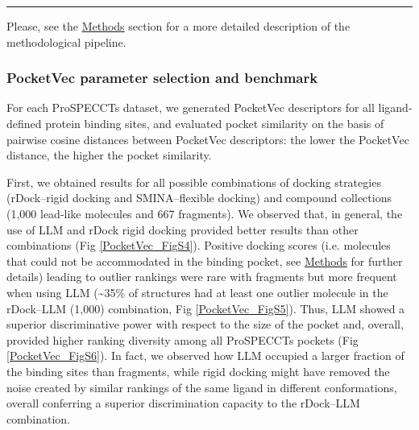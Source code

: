 \begin{Figure_modified}
{  }
  \vspace{-5mm}
  \rule[0ex]{\textwidth}{0.5pt}
  \vspace{-9mm}
  \label{PocketVec_Fig1}
\end{Figure_modified}

Please, see the \hyperref[PocketVec_Methods]{Methods} section for a more detailed description of the methodological pipeline.

\subsubsection{PocketVec parameter selection and benchmark}

For each ProSPECCTs dataset, we generated PocketVec descriptors for all ligand-defined protein binding sites, and evaluated pocket similarity on the basis of pairwise cosine distances between PocketVec descriptors: the lower the PocketVec distance, the higher the pocket similarity. 

First, we obtained results for all possible combinations of docking strategies (rDock--rigid docking and SMINA--flexible docking) and compound collections (1,000 lead-like molecules and 667 fragments). We observed that, in general, the use of LLM and rDock rigid docking provided better results than other combinations (Fig \ref{PocketVec_FigS4}). Positive docking scores (i.e. molecules that could not be accommodated in the binding pocket, see \hyperref[PocketVec_Methods]{Methods} for further details) leading to outlier rankings were rare with fragments but more frequent when using LLM (\textasciitilde35\% of structures had at least one outlier molecule in the rDock--LLM (1,000) combination, Fig \ref{PocketVec_FigS5}). Thus, LLM showed a superior discriminative power with respect to the size of the pocket and, overall, provided higher ranking diversity among all ProSPECCTs pockets (Fig \ref{PocketVec_FigS6}). In fact, we observed how LLM occupied a larger fraction of the binding sites than fragments, while rigid docking might have removed the noise created by similar rankings of the same ligand in different conformations, overall conferring a superior discrimination capacity to the rDock--LLM combination.

